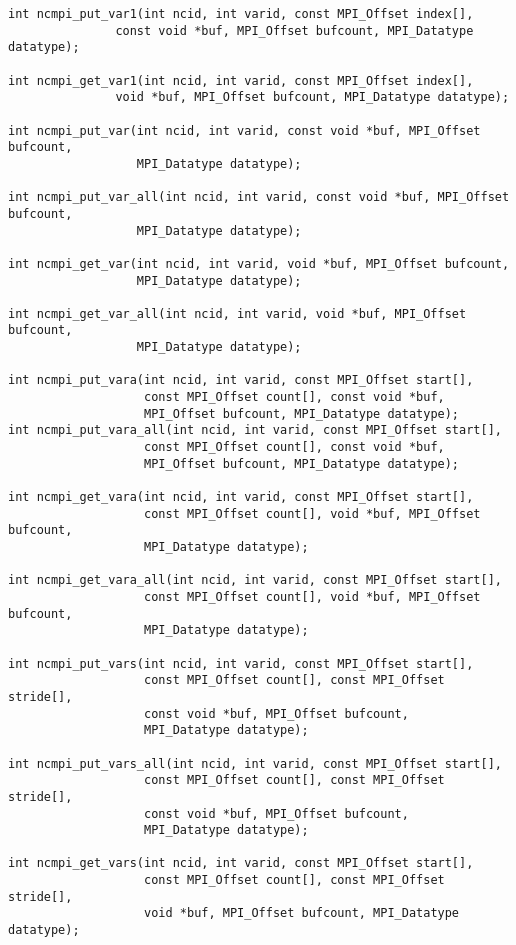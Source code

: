 \begin{verbatim}
int ncmpi_put_var1(int ncid, int varid, const MPI_Offset index[],
               const void *buf, MPI_Offset bufcount, MPI_Datatype datatype);

int ncmpi_get_var1(int ncid, int varid, const MPI_Offset index[],
               void *buf, MPI_Offset bufcount, MPI_Datatype datatype);

int ncmpi_put_var(int ncid, int varid, const void *buf, MPI_Offset bufcount,
                  MPI_Datatype datatype);

int ncmpi_put_var_all(int ncid, int varid, const void *buf, MPI_Offset bufcount,
                  MPI_Datatype datatype);

int ncmpi_get_var(int ncid, int varid, void *buf, MPI_Offset bufcount,
                  MPI_Datatype datatype);

int ncmpi_get_var_all(int ncid, int varid, void *buf, MPI_Offset bufcount,
                  MPI_Datatype datatype);

int ncmpi_put_vara(int ncid, int varid, const MPI_Offset start[],
                   const MPI_Offset count[], const void *buf,
                   MPI_Offset bufcount, MPI_Datatype datatype);
int ncmpi_put_vara_all(int ncid, int varid, const MPI_Offset start[],
                   const MPI_Offset count[], const void *buf,
                   MPI_Offset bufcount, MPI_Datatype datatype);

int ncmpi_get_vara(int ncid, int varid, const MPI_Offset start[],
                   const MPI_Offset count[], void *buf, MPI_Offset bufcount,
                   MPI_Datatype datatype);

int ncmpi_get_vara_all(int ncid, int varid, const MPI_Offset start[],
                   const MPI_Offset count[], void *buf, MPI_Offset bufcount,
                   MPI_Datatype datatype);

int ncmpi_put_vars(int ncid, int varid, const MPI_Offset start[],
                   const MPI_Offset count[], const MPI_Offset stride[],
                   const void *buf, MPI_Offset bufcount,
                   MPI_Datatype datatype);

int ncmpi_put_vars_all(int ncid, int varid, const MPI_Offset start[],
                   const MPI_Offset count[], const MPI_Offset stride[],
                   const void *buf, MPI_Offset bufcount,
                   MPI_Datatype datatype);

int ncmpi_get_vars(int ncid, int varid, const MPI_Offset start[],
                   const MPI_Offset count[], const MPI_Offset stride[],
                   void *buf, MPI_Offset bufcount, MPI_Datatype datatype);


\end{verbatim}
